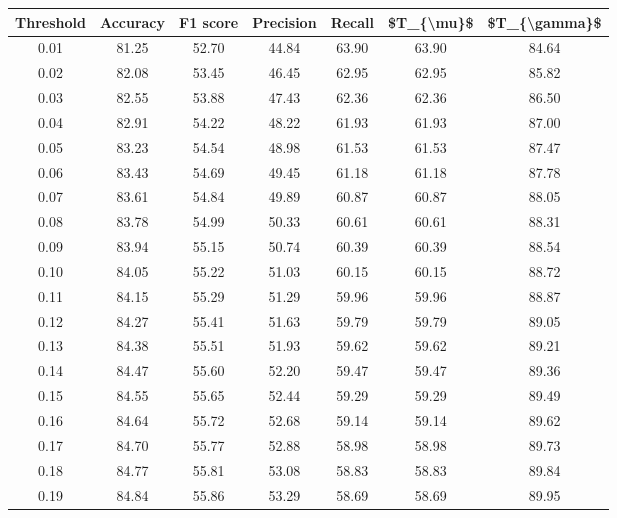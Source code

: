 \begin{tabular}{|c|c|c|c|c|c|c|}
\hline
 Threshold &  Accuracy &  F1 score &  Precision &  Recall &  \$T\_\{\textbackslash mu\}\$ &  \$T\_\{\textbackslash gamma\}\$ \\
\hline
      0.01 &     81.25 &     52.70 &      44.84 &   63.90 &      63.90 &         84.64 \\
      0.02 &     82.08 &     53.45 &      46.45 &   62.95 &      62.95 &         85.82 \\
      0.03 &     82.55 &     53.88 &      47.43 &   62.36 &      62.36 &         86.50 \\
      0.04 &     82.91 &     54.22 &      48.22 &   61.93 &      61.93 &         87.00 \\
      0.05 &     83.23 &     54.54 &      48.98 &   61.53 &      61.53 &         87.47 \\
      0.06 &     83.43 &     54.69 &      49.45 &   61.18 &      61.18 &         87.78 \\
      0.07 &     83.61 &     54.84 &      49.89 &   60.87 &      60.87 &         88.05 \\
      0.08 &     83.78 &     54.99 &      50.33 &   60.61 &      60.61 &         88.31 \\
      0.09 &     83.94 &     55.15 &      50.74 &   60.39 &      60.39 &         88.54 \\
      0.10 &     84.05 &     55.22 &      51.03 &   60.15 &      60.15 &         88.72 \\
      0.11 &     84.15 &     55.29 &      51.29 &   59.96 &      59.96 &         88.87 \\
      0.12 &     84.27 &     55.41 &      51.63 &   59.79 &      59.79 &         89.05 \\
      0.13 &     84.38 &     55.51 &      51.93 &   59.62 &      59.62 &         89.21 \\
      0.14 &     84.47 &     55.60 &      52.20 &   59.47 &      59.47 &         89.36 \\
      0.15 &     84.55 &     55.65 &      52.44 &   59.29 &      59.29 &         89.49 \\
      0.16 &     84.64 &     55.72 &      52.68 &   59.14 &      59.14 &         89.62 \\
      0.17 &     84.70 &     55.77 &      52.88 &   58.98 &      58.98 &         89.73 \\
      0.18 &     84.77 &     55.81 &      53.08 &   58.83 &      58.83 &         89.84 \\
      0.19 &     84.84 &     55.86 &      53.29 &   58.69 &      58.69 &         89.95 \\

\end{tabular}
